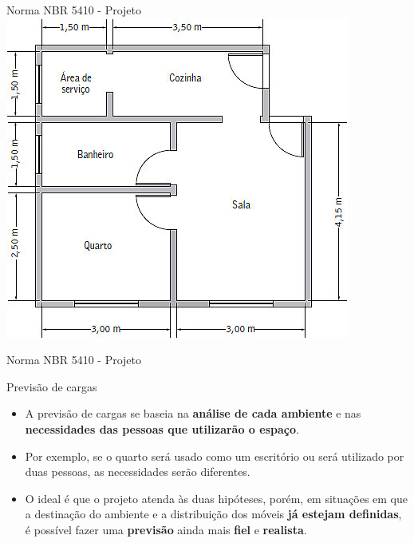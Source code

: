 \begin{frame}{Norma NBR 5410 - Projeto}
	\centering
	\includegraphics[width=0.7\linewidth]{Figuras/Ch02/fig3}

\end{frame}


\begin{frame}{Norma NBR 5410 - Projeto}
	\begin{block}{Previsão de cargas}
		\begin{itemize}
			\item A previsão de cargas se baseia na \textbf{análise de cada ambiente} e nas \textbf{necessidades das pessoas que utilizarão o espaço}.
			\item Por exemplo, se o quarto será usado como um escritório ou será utilizado por duas pessoas, as necessidades serão diferentes.
			\item O ideal é que o projeto atenda às duas hipóteses, porém, em situações em que a destinação do ambiente e a distribuição dos móveis \textbf{já estejam definidas}, é possível fazer uma \textbf{previsão} ainda mais \textbf{fiel} e \textbf{realista}.
		\end{itemize}
	\end{block}
\end{frame}


